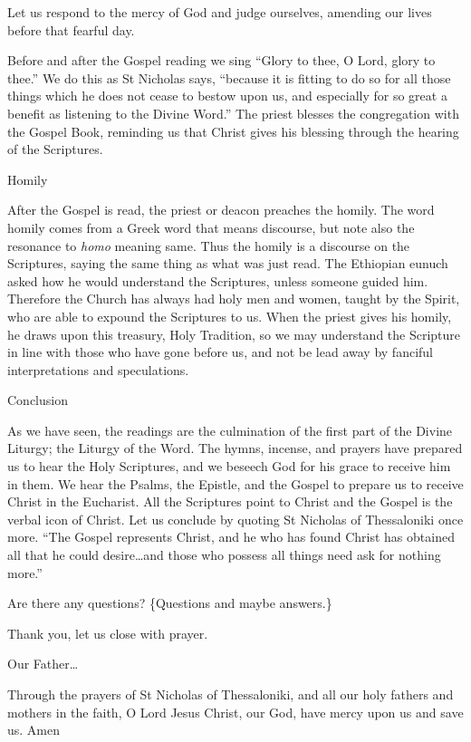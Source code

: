 \documentclass[
]{article}
\begin{document}
Let us respond to the mercy of God and judge ourselves, amending our
lives before that fearful day.

Before and after the Gospel reading we sing ``Glory to thee, O Lord,
glory to thee.'' We do this as St Nicholas says, ``because it is fitting
to do so for all those things which he does not cease to bestow upon us,
and especially for so great a benefit as listening to the Divine Word.''
The priest blesses the congregation with the Gospel Book, reminding us
that Christ gives his blessing through the hearing of the Scriptures.

Homily

After the Gospel is read, the priest or deacon preaches the homily. The
word homily comes from a Greek word that means discourse, but note also
the resonance to \emph{homo} meaning same. Thus the homily is a
discourse on the Scriptures, saying the same thing as what was just
read. The Ethiopian eunuch asked how he would understand the Scriptures,
unless someone guided him. Therefore the Church has always had holy men
and women, taught by the Spirit, who are able to expound the Scriptures
to us. When the priest gives his homily, he draws upon this treasury,
Holy Tradition, so we may understand the Scripture in line with those
who have gone before us, and not be lead away by fanciful
interpretations and speculations.

Conclusion

As we have seen, the readings are the culmination of the first part of
the Divine Liturgy; the Liturgy of the Word. The hymns, incense, and
prayers have prepared us to hear the Holy Scriptures, and we beseech God
for his grace to receive him in them. We hear the Psalms, the Epistle,
and the Gospel to prepare us to receive Christ in the Eucharist. All the
Scriptures point to Christ and the Gospel is the verbal icon of Christ.
Let us conclude by quoting St Nicholas of Thessaloniki once more. ``The
Gospel represents Christ, and he who has found Christ has obtained all
that he could desire\ldots and those who possess all things need ask for
nothing more.''

Are there any questions? \{Questions and maybe answers.\}

Thank you, let us close with prayer.

Our Father\ldots{}

Through the prayers of St Nicholas of Thessaloniki, and all our holy
fathers and mothers in the faith, O Lord Jesus Christ, our God, have
mercy upon us and save us. Amen
\end{document}
